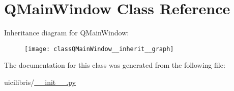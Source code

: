 \hypertarget{classQMainWindow}{\section{\-Q\-Main\-Window \-Class \-Reference}
\label{classQMainWindow}
}


\-Inheritance diagram for \-Q\-Main\-Window\-:
\nopagebreak
\begin{figure}[H]
\begin{center}
\leavevmode
\texttt{[image: classQMainWindow\_\_inherit\_\_graph]}
\end{center}
\end{figure}


\-The documentation for this class was generated from the following file\-:\begin{DoxyCompactItemize}
\item 
uicilibris/\hyperlink{____init_____8py}{\-\_\-\-\_\-init\-\_\-\-\_\-.\-py}\end{DoxyCompactItemize}
